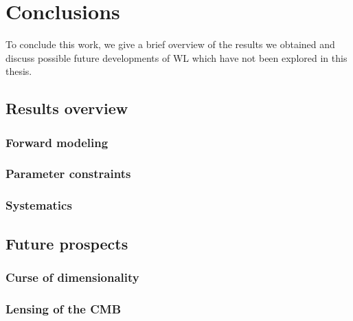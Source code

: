 
\chapter{Conclusions}
\lhead[\fancyplain{}{\thepage}]{\fancyplain{}{\rightmark}}
 \thispagestyle{plain}
\setlength{\parindent}{10mm}
\label{chp:8}

To conclude this work, we give a brief overview of the results we obtained and discuss possible future developments of WL which have not been explored in this thesis. 

\section{Results overview}

\subsection{Forward modeling}
\subsection{Parameter constraints}
\subsection{Systematics}

\section{Future prospects}

\subsection{Curse of dimensionality}
\subsection{Lensing of the CMB}

%